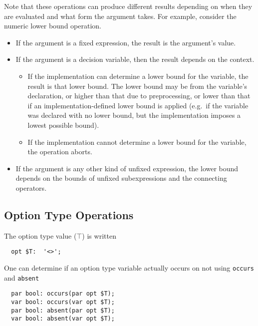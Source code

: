 \documentclass[10pt]{scrartcl}
\begin{document}
\vspace{2mm}

Note that these operations can produce different results depending on when
they are evaluated and what form the argument takes.  For example, consider
the numeric lower bound operation.
\begin{itemize}
\item
    If the argument is a fixed expression, the result is the argument's
    value.
\item
    If the argument is a decision variable, then the result depends on
    the context.
    \begin{itemize}
    \item
        If the implementation can determine a lower bound for the variable,
        the result is that lower bound.
        The lower bound may be from the variable's declaration,
        or higher than that due to preprocessing,
        or lower than that if an implementation-defined lower bound is applied
        (e.g.~if the variable was declared with no lower bound,
        but the implementation imposes a lowest possible bound).
    \item
        If the implementation cannot determine a lower bound for the variable,
        the operation aborts.
    \end{itemize}
\item
    If the argument is any other kind of unfixed expression, the
    lower bound depends on the bounds of unfixed subexpressions
    and the connecting operators.
\end{itemize}

\subsection{Option Type Operations}
     \label{Option Type Operations}

\builtin{}
The option type value ($\top$) is written
\begin{verbatim}
  opt $T:  '<>';
\end{verbatim}

One can determine if an option type variable actually occurs on not using
\texttt{occurs} and \texttt{absent}
\begin{verbatim}
  par bool: occurs(par opt $T);
  var bool: occurs(var opt $T);
  par bool: absent(par opt $T);
  var bool: absent(var opt $T);
\end{verbatim}
\end{document}

